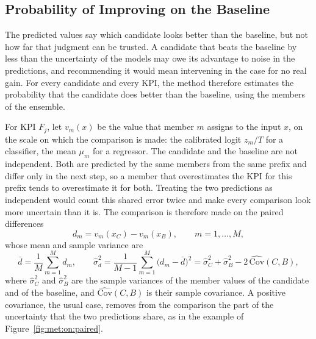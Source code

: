 
\subsection{Probability of Improving on the Baseline}
\label{subsec:met:online:prob}
The predicted values say which candidate looks better than the baseline, but
not how far that judgment can be trusted. A candidate that beats the
baseline by less than the uncertainty of the models may owe its advantage to
noise in the predictions, and recommending it would mean intervening in the
case for no real gain. For every candidate and every KPI, the method
therefore estimates the probability that the candidate does better than the
baseline, using the members of the ensemble.

For KPI $F_j$, let $v_m(x)$ be the value that member $m$ assigns to the
input $x$, on the scale on which the comparison is made: the calibrated
logit $z_m / T$ for a classifier, the mean $\mu_m$ for a regressor. The
candidate and the baseline are not independent. Both are predicted by the
same members from the same prefix and differ only in the next step, so a
member that overestimates the KPI for this prefix tends to overestimate it
for both. Treating the two predictions as independent would count this
shared error twice and make every comparison look more uncertain than it
is. The comparison is therefore made on the paired differences
\begin{equation}
  d_m = v_m(x_C) - v_m(x_B), \qquad m = 1, \dots, M,
  \label{eq:met:on:diff}
\end{equation}
whose mean and sample variance are
\begin{equation}
  \bar{d} = \frac{1}{M} \sum_{m=1}^{M} d_m, \qquad
  \hat{\sigma}_d^{2} = \frac{1}{M-1} \sum_{m=1}^{M} \bigl( d_m - \bar{d}
  \bigr)^{2} = \hat{\sigma}_C^{2} + \hat{\sigma}_B^{2} -
  2\, \widehat{\mathrm{Cov}}(C, B),
  \label{eq:met:on:diffstats}
\end{equation}
where $\hat{\sigma}_C^{2}$ and $\hat{\sigma}_B^{2}$ are the sample variances
of the member values of the candidate and of the baseline, and
$\widehat{\mathrm{Cov}}(C, B)$ is their sample covariance. A positive
covariance, the usual case, removes from the comparison the part of the
uncertainty that the two predictions share, as in the example of
Figure~\ref{fig:met:on:paired}.

